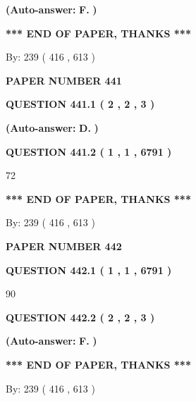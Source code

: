 \documentclass{ctexart}
\begin{document}
 
{\textbf{(Auto-answer:}}
{\textbf{\large{
F.}}}
{\textbf{)}}
 
 
   
   
   
   
\vspace{1.0in} 
{\textbf{\large{ *** END OF PAPER, THANKS *** }}} 
   
   
\hspace{1.0in} By: 
 239 ( 416 ,  613 )
   
   
   
   
\newpage 
\setcounter{page}{ 
   441001 } 
   
   
 {\textbf{ \Large{ PAPER NUMBER  441  }}}
   
   
   
   
  
  
{\textbf{\large{QUESTION
441.1 
 ( 2 , 2 , 3 )
}}}
 
 
{\textbf{(Auto-answer:}}
{\textbf{\large{
D.}}}
{\textbf{)}}
 
 
  
  
{\textbf{\large{QUESTION
441.2 
 ( 1 , 1 , 6791 )
}}}

72
   
   
   
   
\vspace{1.0in} 
{\textbf{\large{ *** END OF PAPER, THANKS *** }}} 
   
   
\hspace{1.0in} By: 
 239 ( 416 ,  613 )
   
   
   
   
\newpage 
\setcounter{page}{ 
   442001 } 
   
   
 {\textbf{ \Large{ PAPER NUMBER  442  }}}
   
   
   
   
  
  
{\textbf{\large{QUESTION
442.1 
 ( 1 , 1 , 6791 )
}}}

90
  
  
{\textbf{\large{QUESTION
442.2 
 ( 2 , 2 , 3 )
}}}
 
 
{\textbf{(Auto-answer:}}
{\textbf{\large{
F.}}}
{\textbf{)}}
 
 
   
   
   
   
\vspace{1.0in} 
{\textbf{\large{ *** END OF PAPER, THANKS *** }}} 
   
   
\hspace{1.0in} By: 
 239 ( 416 ,  613 )
   
   
   
\end{document}
